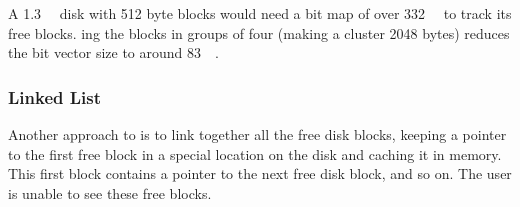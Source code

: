 A \SI{1.3}{\gibi{} \byte{}} disk with 512 byte blocks would need a bit map of over \SI{332}{\kibi{} \byte{}} to track its free blocks.
ing the blocks in groups of four (making a cluster 2048 bytes) reduces the bit vector size to around \SI{83}{\kibi{} \byte{}}.

\subsubsection{Linked List}\label{subsubsec:Free_Space_Linked_List}
Another approach to  is to link together all the free disk blocks, keeping a pointer to the first free block in a special location on the disk and caching it in memory.
This first block contains a pointer to the next free disk block, and so on.
The user is unable to see these free blocks.


